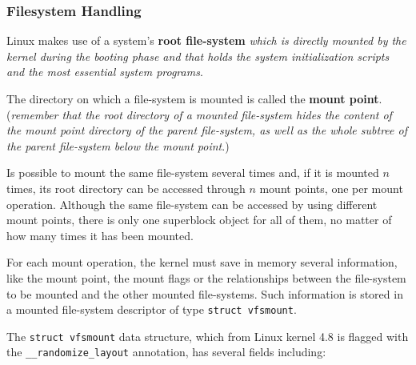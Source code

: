 \documentclass[10pt,a4paper]{article}
\begin{document}
\subsubsection{Filesystem Handling}

Linux makes use of a system's \textbf{root file-system} \textit{which is directly mounted by the kernel during the booting phase and that holds the system initialization scripts and the most essential system programs}.

The directory on which a file-system is mounted is called the \textbf{mount point}. (\textit{remember that the root directory of a mounted file-system hides the content of the mount point directory of the parent file-system, as well as the whole subtree of the parent file-system below the mount point}.)

Is possible to mount the same file-system several times and, if it is mounted $n$ times, its root directory can be accessed
through $n$ mount points, one per mount operation. Although the same file-system can be accessed by using different mount points, there is only one superblock object for all of them, no matter of how many times it has been mounted.

For each mount operation, the kernel must save in memory several information, like the mount point, the mount flags or the relationships between the file-system to be mounted and the other mounted file-systems. Such information is stored in a mounted file-system descriptor of type \texttt{struct vfsmount}. 

The \texttt{struct vfsmount} data structure, which from Linux kernel 4.8 is flagged with the \texttt{\_\_randomize\_layout} annotation, has several fields including:
\end{document}
